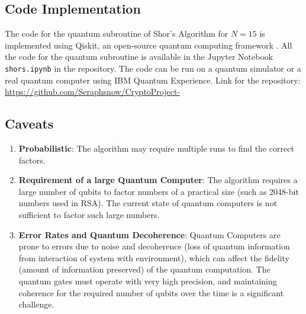 \documentclass[12pt]{article}
\begin{document}
\subsection{Code Implementation}
The code for the quantum subroutine of Shor's Algorithm for $N=15$ is implemented using Qiskit, an open-source quantum computing framework \cite{qiskit}. All the code for the quantum subroutine is available in the Jupyter Notebook \texttt{shors.ipynb} in the repository. The code can be run on a quantum simulator or a real quantum computer using IBM Quantum Experience. Link for the repository: \url{https://github.com/Seraphsnow/CryptoProject-}

\subsection{Caveats}
\begin{enumerate}
    \item \textbf{Probabilistic}: The algorithm may require multiple runs to find the correct factors.
    \item \textbf{Requirement of a large Quantum Computer}: The algorithm requires a large number of qubits to factor numbers of a practical size (such as 2048-bit numbers used in RSA). The current state of quantum computers is not sufficient to factor such large numbers.
    \item \textbf{Error Rates and Quantum Decoherence}: Quantum Computers are prone to errors due to noise and decoherence (loss of quantum information from interaction of system with environment), which can affect the fidelity (amount of information preserved) of the quantum computation. The quantum gates must operate with very high precision, and maintaining coherence for the required number of qubits over the time is a significant challenge.
\end{enumerate}
\end{document}
